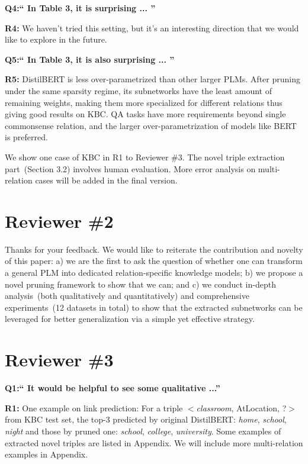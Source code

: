 \documentclass[letterpaper]{article} %
\newcommand{\KZ}[1]{\textcolor{blue}{Kenny: #1}}
\begin{document}
\noindent
\textbf{Q4:`` In Table 3, it is surprising  ... ''}

\noindent
\textbf{R4: } We haven't tried this setting, but it's an interesting direction that we would like to explore in the future.

\noindent
\textbf{Q5:`` In Table 3, it is also surprising  ... ''}

\noindent
\textbf{R5: } DistilBERT is less over-parametrized than other larger PLMs. After pruning under the same sparsity regime, its subnetworks have the least amount of remaining weights, making them more specialized for different relations 
thus giving good results on KBC. QA tasks have more requirements beyond 
single commonsense relation, and the larger over-parametrization of models 
like BERT is preferred.

We show one case of KBC in R1 to Reviewer \#3. The novel triple extraction part~(Section 3.2) involves human evaluation. More error analysis on multi-relation cases will be added in the final version. 

\section*{Reviewer \#2}
Thanks for your feedback. We would like to reiterate the contribution and 
novelty of this paper: a) we are the first to ask the question of whether one can transform a general PLM into dedicated relation-specific knowledge models; 
b) we propose a novel pruning framework to show that we can; and 
c) we conduct in-depth analysis~(both qualitatively and quantitatively) 
and comprehensive experiments~(12 datasets in total) to show 
that the extracted subnetworks can be leveraged for better generalization via a simple yet effective strategy.

\section*{Reviewer \#3}
\noindent
\textbf{Q1:`` It would be helpful to see some qualitative ...''}

\noindent
\textbf{R1:} One example on link prediction: For a triple $<$\textit{classroom}, AtLocation, ?$>$ from KBC test set, the top-3 predicted by original DistilBERT: \textit{home}, \textit{school}, \textit{night} and those by pruned one: \textit{school}, \textit{college}, \textit{university}. Some examples of extracted novel triples are listed in Appendix. We will include more multi-relation examples in Appendix.
\end{document}
